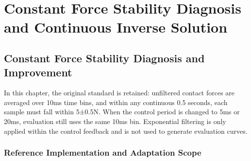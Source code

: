 
\FloatBarrier

\section{Constant Force Stability Diagnosis and Continuous Inverse Solution}

\label{stage:s12}

\subsection{Constant Force Stability Diagnosis and Improvement}\label{s12-detail-1}

In this chapter, the original standard is retained: unfiltered contact forces are averaged over 10ms time bins, and within any continuous 0.5 seconds, each sample must fall within 5±0.5N. When the control period is changed to 5ms or 20ms, evaluation still uses the same 10ms bin. Exponential filtering is only applied within the control feedback and is not used to generate evaluation curves.

\subsubsection{Reference Implementation and Adaptation Scope}\label{s12-detail-2}


